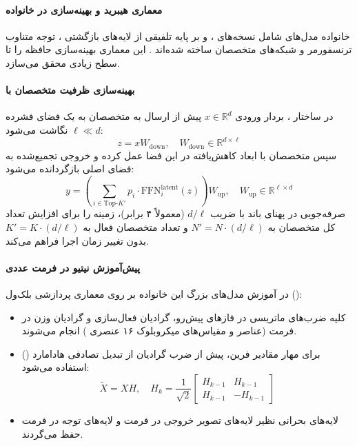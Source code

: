 \item {}

\paragraph*{معماری هیبرید و بهینه‌سازی در خانواده }
خانواده مدل‌های  شامل نسخه‌های ،  و  بر پایه تلفیقی از لایه‌های بازگشتی ، توجه متناوب ترنسفورمر و شبکه‌های متخصصان  ساخته شده‌اند \cite{nvidia2025nemotron3}. این معماری بهینه‌سازی حافظه  را تا سطح زیادی محقق می‌سازد.

\paragraph*{بهینه‌سازی ظرفیت متخصصان با }
در ساختار ، بردار ورودی $x \in \mathbb{R}^d$ پیش از ارسال به متخصصان به یک فضای فشرده $\ell \ll d$ نگاشت می‌شود:
\begin{equation}
    z = x W_{\text{down}}, \quad W_{\text{down}} \in \mathbb{R}^{d \times \ell}
\end{equation}
سپس متخصصان با ابعاد کاهش‌یافته در این فضا عمل کرده و خروجی تجمیع‌شده به فضای اصلی بازگردانده می‌شود:
\begin{equation}
    y = \left( \sum_{i \in \text{Top-}K'} p_i \cdot \text{FFN}_i^{\text{latent}}(z) \right) W_{\text{up}}, \quad W_{\text{up}} \in \mathbb{R}^{\ell \times d}
\end{equation}
صرفه‌جویی در پهنای باند با ضریب $d/\ell$ (معمولاً ۴ برابر)، زمینه را برای افزایش تعداد کل متخصصان به $N' = N \cdot (d/\ell)$ و تعداد متخصصان فعال به $K' = K \cdot (d/\ell)$ بدون تغییر زمان اجرا فراهم می‌کند.

\paragraph*{پیش‌آموزش نیتیو در فرمت عددی }
در آموزش مدل‌های بزرگ این خانواده بر روی معماری پردازشی بلک‌ول ():
\begin{itemize}
    \item کلیه ضرب‌های ماتریسی در فازهای پیش‌رو، گرادیان فعال‌سازی و گرادیان وزن در فرمت  (عناصر  و مقیاس‌های میکروبلوک ۱۶ عنصری ) انجام می‌شوند.
    \item برای مهار مقادیر فرین، پیش از ضرب گرادیان از تبدیل تصادفی هادامارد () استفاده می‌شود:
    \begin{equation}
        \tilde{X} = X H, \quad H_k = \frac{1}{\sqrt{2}} \begin{bmatrix} H_{k-1} & H_{k-1} \\ H_{k-1} & -H_{k-1} \end{bmatrix}
    \end{equation}
    \item لایه‌های بحرانی نظیر لایه‌های تصویر خروجی  در فرمت  و لایه‌های توجه در فرمت  حفظ می‌گردند.
\end{itemize}


